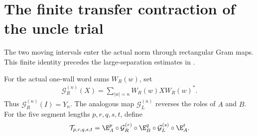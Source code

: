 \section{The finite transfer contraction of the uncle trial}
\label{sec:uncle_trial_transfer_norm}

The two moving intervals enter the actual norm through rectangular Gram
maps. This finite identity precedes the large-separation estimates in
\cite[proof of the low-energy-state lemma]{FernandezGonzalez2015Uncle}.

\begin{definition}
    \label{def:uncle_wall_gram_maps}
    \leanok
    For the actual one-wall word sums $W_R(w)$, set
    \begin{align}
        \mathcal G_R^{(n)}(X)=\sum_{|w|=n}W_R(w)XW_R(w)^*.
        \label{eq:uncle_wall_gram_map}
    \end{align}
    Thus $\mathcal G_R^{(n)}(I)=Y_n$. The analogous map
    $\mathcal G_L^{(n)}$ reverses the roles of $A$ and $B$.
    For the five segment lengths $p,r,q,s,t$, define
    \begin{align}
        \mathcal T_{p,r,q,s,t}=
        \E_A^p\circ\mathcal G_R^{(r)}\circ\E_B^q
        \circ\mathcal G_L^{(s)}\circ\E_A^t.
        \label{eq:uncle_two_wall_transfer}
    \end{align}
\end{definition}

